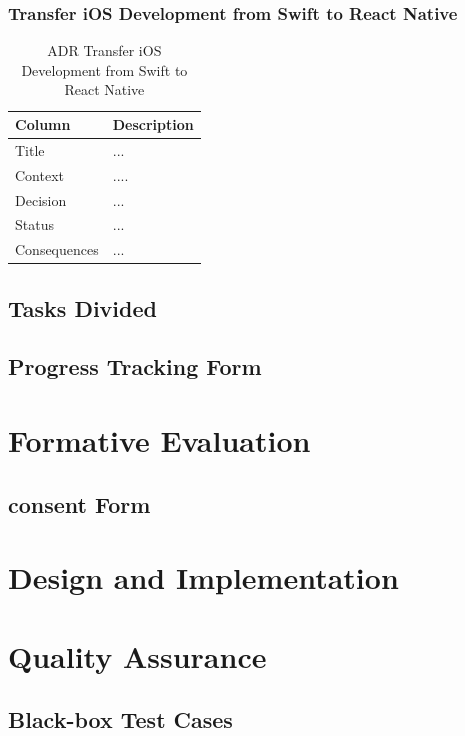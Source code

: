 \documentclass[12pt,a4paper]{article}
\begin{document}
\begin{appendices}
            \subsubsection{Transfer iOS Development from Swift to React Native}
              \begin{table}[H]
                \centering
                  \begin{tabularx}{\textwidth}{l X}
                    \hline
                    Column & Description  \\ \hline
                    Title & ... \\ 
                    Context & ....  \\ 
                    Decision & ...  \\ 
                    Status & ... \\ 
                    Consequences & ... \\                  
                    \hline
                  \end{tabularx}
                  \caption[Table caption text]{ADR Transfer iOS Development from Swift to React Native}
                  \label{table:ADR Transfer iOS Development from Swift to React Native}
              \end{table}

        \subsection{Tasks Divided}
        \subsection{Progress Tracking Form}\label{appendix:progress-tracking-form}
          
          
      \section{Formative Evaluation}
        \subsection{consent Form}\label{appendix:consent-form}
          
          
      \section{Design and Implementation}
        
      \section{Quality Assurance}
        \subsection{Black-box Test Cases}\label{appendix:black-box-test-cases}
        
    \end{appendices}

  
\end{document}
